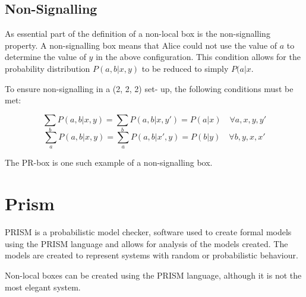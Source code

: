 \documentclass[report.tex]{subfiles}
\begin{document}
\subsection{Non-Signalling} %
\label{sub:non_signalling}
As essential part of the definition of a non-local box is the non-signalling
property. A non-signalling box means that Alice could not use the value of \(a\)
to determine the value of \(y\) in the above configuration. This condition
allows for the probability distribution \(P(a, b | x, y)\) to be reduced to
simply \(P(a|x\).

To ensure non-signalling in a (2, 2, 2) set- up, the following conditions must
be met:

\[\sum_{b} P(a, b | x, y) = \sum_{b} P(a, b | x, y') = P(a | x) 
\quad \forall a, x, y, y'\]
\[\sum_{a} P(a, b | x, y) = \sum_{a} P(a, b | x', y) = P(b | y) 
\quad \forall b, y, x, x'\]

The PR-box is one such example of a non-signalling box.


\section{Prism} %
\label{sec:prism}
PRISM is a probabilistic model checker, software used to create formal models
using the PRISM language and allows for analysis of the models created. The
models are created to represent systems with random or probabilistic behaviour.

Non-local boxes can be created using the PRISM language, although it is not the
most elegant system.

\newpage
\end{document}
